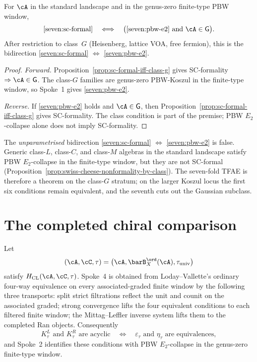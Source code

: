 \begin{proposition}
\label{prop:ftm-spoke-sc-pbw}
For $\cA$ in the standard landscape and in the genus-zero finite-type
PBW window,
\[
\ref{seven:sc-formal}
\quad\Longleftrightarrow\quad
\bigl(\ref{seven:pbw-e2}\ \text{and}\ \cA\in\mathsf{G}\bigr).
\]
After restriction to class~$G$ (Heisenberg, lattice VOA, free
fermion), this is the bidirection
\ref{seven:sc-formal} $\Leftrightarrow$ \ref{seven:pbw-e2}.
\end{proposition}

\begin{proof}
\emph{Forward.}  Proposition~\ref{prop:sc-formal-iff-class-g} gives
SC-formality $\Rightarrow \cA\in\mathsf{G}$.  The class-$G$ families
are genus-zero PBW-Koszul in the finite-type window, so Spoke~1 gives
\ref{seven:pbw-e2}.

\emph{Reverse.}  If \ref{seven:pbw-e2} holds and
$\cA\in\mathsf{G}$, then
Proposition~\ref{prop:sc-formal-iff-class-g} gives
SC-formality.  The class condition is part of the premise; PBW
$E_2$-collapse alone does not imply SC-formality.
\end{proof}

\begin{remark}
\label{rem:sc-formal-parametrised-scope}
The \emph{unparametrised} bidirection \ref{seven:sc-formal}
$\Leftrightarrow$ \ref{seven:pbw-e2} is false.  Generic class-$L$,
class-$C$, and class-$M$ algebras in the standard landscape satisfy
PBW $E_2$-collapse in the finite-type window, but they are not
SC-formal
(Proposition~\ref{prop:swiss-cheese-nonformality-by-class}).  The
seven-fold TFAE is therefore a theorem on the class-$G$ stratum; on
the larger Koszul locus the first six conditions remain equivalent,
and the seventh cuts out the Gaussian subclass.
\end{remark}

\section{The completed chiral comparison}
\label{sec:ftm-sevenfold-nontautology}

\begin{proposition}
\label{prop:no-tautology-at-g0}
Let
\[
 (\cA,\cC,\tau)
 =\bigl(\cA,\barB_X^{\ord}(\cA),\tau_{\mathrm{univ}}\bigr)
\]
satisfy $H_{\mathrm{CL}}(\cA,\cC,\tau)$.  Spoke~4 is obtained from
Loday--Vallette's ordinary four-way equivalence on every
associated-graded finite window by the following three transports:
split strict filtrations reflect the unit and counit on the associated
graded; strong convergence lifts the four equivalent conditions to
each filtered finite window; the Mittag--Leffler inverse system lifts
them to the completed Ran objects.  Consequently
\[
 K_\tau^L\text{ and }K_\tau^R\text{ are acyclic}
 \quad\Longleftrightarrow\quad
 \varepsilon_\tau\text{ and }\eta_\tau\text{ are equivalences},
\]
and Spoke~2 identifies these conditions with PBW $E_2$-collapse in
the genus-zero finite-type window.
\end{proposition}

